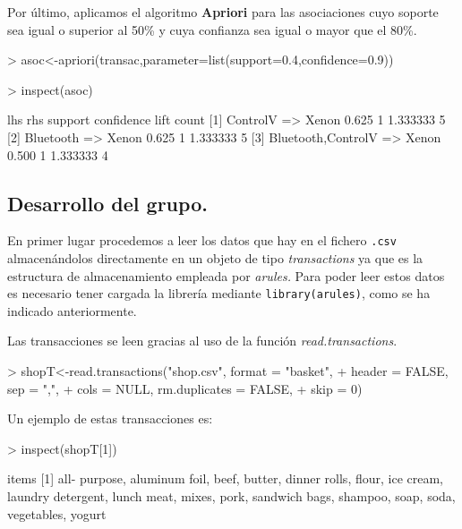 \documentclass [a4paper] {article}
\begin{document}
{\bigskip
Por último, aplicamos el algoritmo \textbf{Apriori} para las asociaciones cuyo soporte sea igual o superior al 50\% y cuya confianza
sea igual o mayor que el 80\%.
\begin{Schunk}
\begin{Sinput}
> asoc<-apriori(transac,parameter=list(support=0.4,confidence=0.9))
\end{Sinput}
\end{Schunk}
\begin{Schunk}
\begin{Sinput}
> inspect(asoc)
\end{Sinput}
\begin{Soutput}
    lhs                     rhs     support confidence lift     count
[1] {ControlV}           => {Xenon} 0.625   1          1.333333 5    
[2] {Bluetooth}          => {Xenon} 0.625   1          1.333333 5    
[3] {Bluetooth,ControlV} => {Xenon} 0.500   1          1.333333 4    
\end{Soutput}
\end{Schunk}

\bigskip
\subsection{Desarrollo del grupo.}

En primer lugar procedemos a leer los datos que hay en el fichero \texttt{.csv} almacenándolos directamente
en un objeto de tipo \textit{transactions} ya que es la estructura de almacenamiento empleada por \textit{arules.}
Para poder leer estos datos es necesario tener cargada la librería mediante \texttt{library(arules)}, como se ha
indicado anteriormente.

Las transacciones se leen gracias al uso de la función \textit{read.transactions}.
\begin{Schunk}
\begin{Sinput}
> shopT<-read.transactions("shop.csv", format = "basket", 
+                   header = FALSE, sep = ",", 
+                   cols = NULL, rm.duplicates = FALSE, 
+                   skip = 0)
\end{Sinput}
\end{Schunk}

\bigskip
Un ejemplo de estas transacciones es:
\begin{Schunk}
\begin{Sinput}
> inspect(shopT[1])
\end{Sinput}
\begin{Soutput}
    items              
[1] {all- purpose,     
     aluminum foil,    
     beef,             
     butter,           
     dinner rolls,     
     flour,            
     ice cream,        
     laundry detergent,
     lunch meat,       
     mixes,            
     pork,             
     sandwich bags,    
     shampoo,          
     soap,             
     soda,             
     vegetables,       
     yogurt}           
\end{Soutput}
\end{Schunk}

}
\end{document}
